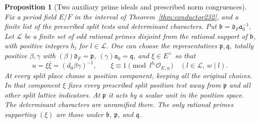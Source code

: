 \documentclass[a4paper,11pt]{article}
\newtheorem{proposition}{Proposition}[section]
\theoremstyle{definition}
\theoremstyle{remark}
\numberwithin{equation}{section}
\newcommand{\OO}{\mathcal O}
\begin{document}
\begin{proposition}[Two auxiliary prime ideals and prescribed norm congruences]
\label{prop:ray233}
Fix a period field \(E/F\) in the interval of Theorem~\ref{thm:conductor232}, and a finite list of the prescribed
split tests and determinant characters. Put
\(\mathfrak b=\mathfrak d_F\mathfrak a_0^{-1}\). Let \(\mathcal L\)
be a finite set of odd rational primes disjoint from the rational
support of \(\mathfrak b\), with positive integers \(h_l\) for
\(l\in\mathcal L\). One can choose the representatives
\(\mathfrak p,\mathfrak q\), totally positive \(\beta,\gamma\) with
\((\beta)\mathfrak d_F=\mathfrak p\),
\((\gamma)\mathfrak a_0=\mathfrak q\), and \(\xi\in E^\times\)
so that
\[
   u=\xi\bar\xi=(d_0\beta\gamma)^{-1},\qquad
   \xi\equiv 1\pmod{l^{h_l}\OO_{E,w}}
                   \quad(l\in\mathcal L,\ w\mid l).
\]
At every split place choose a position component, keeping all the
original choices. In that component \(\xi\) fixes every prescribed
split position test away from \(\mathfrak p\) and all other split
lattice indicators. At \(\mathfrak p\) it acts by a scalar unit
in the position space. The determinant characters are unramified
there. The only rational primes supporting \((\xi)\) are those
under \(\mathfrak b\), \(\mathfrak p\), and \(\mathfrak q\).
\end{proposition}
\end{document}
